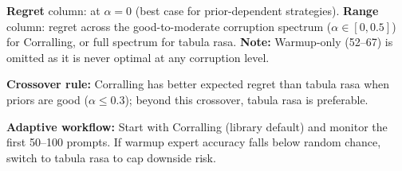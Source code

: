 \begin{table}[t]
\vspace{0.5em}
\small
\textbf{Regret} column: at $\alpha{=}0$ (best case for prior-dependent strategies).
\textbf{Range} column: regret across the good-to-moderate corruption
spectrum ($\alpha \in [0, 0.5]$) for Corralling, or full spectrum for
tabula rasa.
\textbf{Note:} Warmup-only (52--67) is omitted as it is never optimal at
any corruption level.

\textbf{Crossover rule:}
Corralling has better expected regret than tabula rasa when
priors are good ($\alpha \leq 0.3$); beyond this crossover,
tabula rasa is preferable.

\textbf{Adaptive workflow:}
Start with Corralling (library default) and monitor the first 50--100
prompts.  If warmup expert accuracy falls below random chance, switch to
tabula rasa to cap downside risk.
\end{table}
